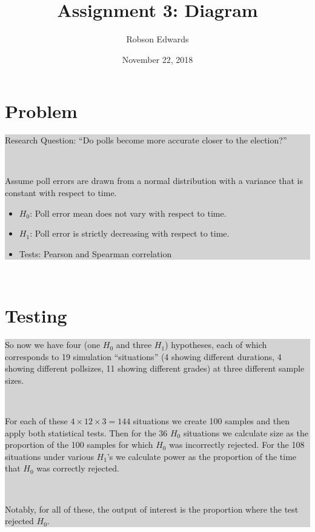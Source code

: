 \documentclass[10pt, oneside]{article}
\title{Assignment 3: Diagram}
\author{Robson Edwards}
\date{November 22, 2018}		%
\newcommand \diabox[2]{\colorbox{lightgray}{\parbox{#1}{#2}}}
\begin{document}
\maketitle

\begin{minipage}[t]{8cm}

\begin{minipage}[t]{8cm}

\section*{Problem}
\diabox{8cm}{
Research Question: ``Do polls become more accurate closer to the election?''

~

Assume poll errors are drawn from a normal distribution with a variance that is constant with respect to time.

\begin{itemize}
\item $H_0$: Poll error mean does not vary with respect to time.

\item $H_1$: Poll error is strictly decreasing with respect to time. 

\item Tests: Pearson and Spearman correlation
\end{itemize}

}
\end{minipage}

\begin{minipage}[t]{8cm}
~

\section*{Testing}
\diabox{8cm}{
So now we have four (one $H_0$ and three $H_1$) hypotheses, each of which corresponds to 19 simulation ``situations'' (4 showing different durations, 4 showing different pollsizes, 11 showing different grades) at three different sample sizes. 

~

For each of these $4 \times 12 \times 3 = 144$ situations we create 100 samples and then apply both statistical tests.
Then for the 36 $H_0$ situations we calculate size as the proportion of the 100 samples for which $H_0$ was incorrectly rejected.
For the 108 situations under various $H_1$'s we calculate power as the proportion of the time that $H_0$ was correctly rejected. 

~

Notably, for all of these, the output of interest is the proportion where the test rejected $H_0$. 
}

\end{minipage}

\end{minipage}
\end{document}
